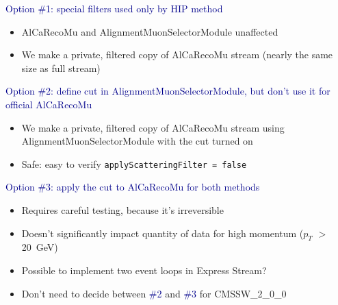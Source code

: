 \documentclass[compress]{beamer}
\begin{document}
\begin{frame}
\textcolor{darkblue}{Option \#1: special filters used only by HIP method}
\begin{itemize}
\item AlCaRecoMu and AlignmentMuonSelectorModule unaffected
\item We make a private, filtered copy of AlCaRecoMu stream (nearly
the same size as full stream)
\end{itemize}

\vfill
\textcolor{darkblue}{Option \#2: define cut in AlignmentMuonSelectorModule, but don't use it for official AlCaRecoMu}
\begin{itemize}
\item We make a private, filtered copy of AlCaRecoMu stream using
AlignmentMuonSelectorModule with the cut turned on
\item Safe: easy to verify {\tt applyScatteringFilter = false}
\end{itemize}

\vfill
\textcolor{darkblue}{Option \#3: apply the cut to AlCaRecoMu for both methods}
\begin{itemize}
\item Requires careful testing, because it's irreversible
\item Doesn't significantly impact quantity of data for high momentum ($p_T$ $>$ 20~GeV)
\item Possible to implement two event loops in Express Stream?
\item Don't need to decide between \textcolor{darkblue}{\#2} and \textcolor{darkblue}{\#3} for CMSSW\_2\_0\_0
\end{itemize}
\end{frame}





\end{document}
